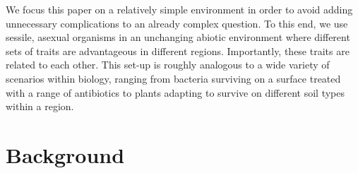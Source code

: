 \documentclass[letterpaper]{article}
\begin{document}
We focus this paper on a relatively simple environment in order to avoid adding unnecessary complications to an already complex question. To this end, we use sessile, asexual  organisms in an unchanging abiotic environment where different sets of traits are advantageous in different regions. Importantly, these traits are related to each other. This set-up is roughly analogous to a wide variety of scenarios within biology, ranging from bacteria surviving on a surface treated with a range of antibiotics to plants adapting to survive on different soil types within a region. 
% 
% 
% 
% 
% 


\section{Background}
\end{document}
